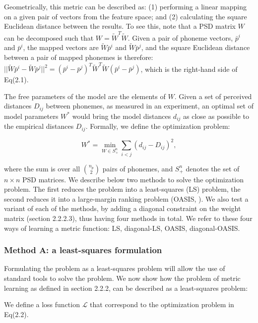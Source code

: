 Geometrically, this metric can be described as: (1) performing a linear mapping on a given pair of vectors from the feature space; and (2) calculating the square Euclidean distance between the results. To see this, note that a PSD matrix $W$ can be decomposed such that $W = \widetilde{W}^T\widetilde{W}$. Given a pair of phoneme vectors, $\bar{p}^i$ and $\bar{p}^i$, the mapped vectors are $\widetilde{W}\bar{p}^i$ and $\widetilde{W}\bar{p}^j$, and the square Euclidean distance between a pair of mapped phonemes is therefore: $||\widetilde{W}\bar{p}^i - \widetilde{W}\bar{p}^j||^2 = (\bar{p}^i - \bar{p}^j)^T\widetilde{W}^T\widetilde{W}(\bar{p}^i - \bar{p}^j)$, which is the right-hand side of Eq(2.1).

The free parameters of the model are the elements of $W$. Given a set of perceived distances ${D_{ij}}$ between phonemes, as measured in an experiment, an optimal set of model parameters $W^\ast$ would bring the model distances $d_{ij}$ as close as possible to the empirical distances $D_{ij}$. Formally, we define the optimization problem:

\begin{equation}
    W^\ast = \min_{W \in S^n_+}{{\sum_{{i} < {j}}{(d_{ij} - D_{ij})^2}}},
\end{equation}

where the sum is over all ${n_p \choose 2}$ pairs of phonemes, and $S^n_+$ denotes the set of $n \times n$ PSD matrices. We describe below two methods to solve the optimization problem. The first reduces the problem into a least-squares (LS) problem, the second reduces it into a large-margin ranking problem (OASIS, \citealp{Chechik2010}). We also test a variant of each of the methods, by adding a diagonal constraint on the weight matrix (section 2.2.2.3), thus having four methods in total. We refer to these four ways of learning a metric function: LS, diagonal-LS, OASIS, diagonal-OASIS.

\subsubsection{Method A: a least-squares formulation}
Formulating the problem as a least-squares problem will allow the use of standard tools to solve the problem. We now show how the problem of metric learning as defined in section 2.2.2, can be described as a least-squares problem:

We define a loss function $\mathcal{L}$ that correspond to the optimization problem in Eq(2.2).


